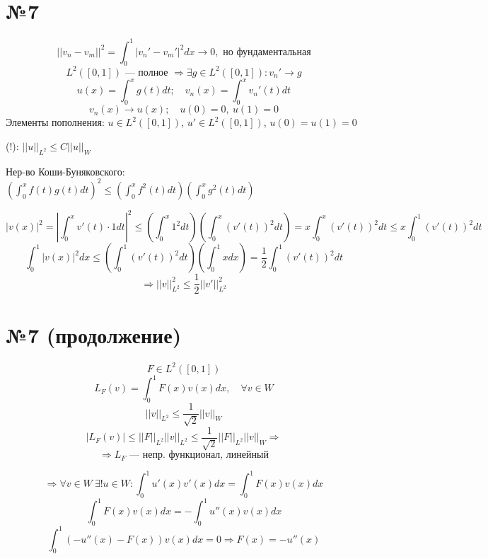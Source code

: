 \documentclass{article}
\begin{document}
\section*{№7}

\[ ||v_n - v_m||^2 = \int_0^1 |v_n' - v_m'|^2 dx \to 0, \text{ но фундаментальная} \]
\[ L^2([0,1]) \text{ — полное } \Rightarrow \exists g \in L^2([0,1]): v_n' \to g \]
\[ u(x) = \int_0^x g(t) dt; \quad v_n(x) = \int_0^x v_n'(t) dt \]
\[ v_n(x) \to u(x); \quad u(0) = 0, \ u(1) = 0 \]
Элементы пополнения: \(u \in L^2([0,1])\), \(u' \in L^2([0,1])\), \(u(0) = u(1) = 0\)

(!): \(||u||_{L^2} \le C ||u||_W\)

Нер-во Коши-Буняковского: \((\int_0^x f(t)g(t) dt)^2 \le (\int_0^x f^2(t) dt)(\int_0^x g^2(t) dt)\)

\[ |v(x)|^2 = |\int_0^x v'(t) \cdot 1 dt|^2 \le (\int_0^x 1^2 dt)(\int_0^x (v'(t))^2 dt) = x \int_0^x (v'(t))^2 dt \le x \int_0^1 (v'(t))^2 dt \]
\[ \int_0^1 |v(x)|^2 dx \le \left( \int_0^1 (v'(t))^2 dt \right) \left( \int_0^1 x dx \right) = \frac{1}{2} \int_0^1 (v'(t))^2 dt \]
\[ \Rightarrow ||v||_{L^2}^2 \le \frac{1}{2} ||v'||_{L^2}^2 \]

\section*{№7 (продолжение)}

\[ F \in L^2([0, 1]) \]
\[ L_F(v) = \int_0^1 F(x)v(x) dx, \quad \forall v \in W \]
\[ ||v||_{L^2} \le \frac{1}{\sqrt{2}} ||v||_W \]
\[ |L_F(v)| \le ||F||_{L^2} ||v||_{L^2} \le \frac{1}{\sqrt{2}} ||F||_{L^2} ||v||_W \Rightarrow \]
\[ \Rightarrow L_F \text{ — непр. функционал, линейный} \]

\noindent{}

\[ \Rightarrow \forall v \in W \ \exists! u \in W: \int_0^1 u'(x)v'(x) dx = \int_0^1 F(x)v(x) dx \]
\[ \int_0^1 F(x)v(x) dx = - \int_0^1 u''(x)v(x) dx \]
\[ \int_0^1 (-u''(x) - F(x))v(x) dx = 0 \Rightarrow F(x) = -u''(x) \]
\end{document}

